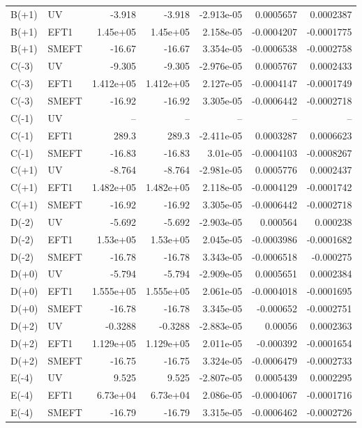 \begin{table}[htbp]
\begin{tabular}{llrrrrr}
B(+1) & UV & -3.918 & -3.918 & -2.913e-05 & 0.0005657 & 0.0002387 \\
B(+1) & EFT1 & 1.45e+05 & 1.45e+05 & 2.158e-05 & -0.0004207 & -0.0001775 \\
B(+1) & SMEFT & -16.67 & -16.67 & 3.354e-05 & -0.0006538 & -0.0002758 \\
C(-3) & UV & -9.305 & -9.305 & -2.976e-05 & 0.0005767 & 0.0002433 \\
C(-3) & EFT1 & 1.412e+05 & 1.412e+05 & 2.127e-05 & -0.0004147 & -0.0001749 \\
C(-3) & SMEFT & -16.92 & -16.92 & 3.305e-05 & -0.0006442 & -0.0002718 \\
C(-1) & UV & -- & -- & -- & -- & -- \\
C(-1) & EFT1 & 289.3 & 289.3 & -2.411e-05 & 0.0003287 & 0.0006623 \\
C(-1) & SMEFT & -16.83 & -16.83 & 3.01e-05 & -0.0004103 & -0.0008267 \\
C(+1) & UV & -8.764 & -8.764 & -2.981e-05 & 0.0005776 & 0.0002437 \\
C(+1) & EFT1 & 1.482e+05 & 1.482e+05 & 2.118e-05 & -0.0004129 & -0.0001742 \\
C(+1) & SMEFT & -16.92 & -16.92 & 3.305e-05 & -0.0006442 & -0.0002718 \\
D(-2) & UV & -5.692 & -5.692 & -2.903e-05 & 0.000564 & 0.000238 \\
D(-2) & EFT1 & 1.53e+05 & 1.53e+05 & 2.045e-05 & -0.0003986 & -0.0001682 \\
D(-2) & SMEFT & -16.78 & -16.78 & 3.343e-05 & -0.0006518 & -0.000275 \\
D(+0) & UV & -5.794 & -5.794 & -2.909e-05 & 0.0005651 & 0.0002384 \\
D(+0) & EFT1 & 1.555e+05 & 1.555e+05 & 2.061e-05 & -0.0004018 & -0.0001695 \\
D(+0) & SMEFT & -16.78 & -16.78 & 3.345e-05 & -0.000652 & -0.0002751 \\
D(+2) & UV & -0.3288 & -0.3288 & -2.883e-05 & 0.00056 & 0.0002363 \\
D(+2) & EFT1 & 1.129e+05 & 1.129e+05 & 2.011e-05 & -0.000392 & -0.0001654 \\
D(+2) & SMEFT & -16.75 & -16.75 & 3.324e-05 & -0.0006479 & -0.0002733 \\
E(-4) & UV & 9.525 & 9.525 & -2.807e-05 & 0.0005439 & 0.0002295 \\
E(-4) & EFT1 & 6.73e+04 & 6.73e+04 & 2.086e-05 & -0.0004067 & -0.0001716 \\
E(-4) & SMEFT & -16.79 & -16.79 & 3.315e-05 & -0.0006462 & -0.0002726 \\

\end{tabular}
\end{table}
